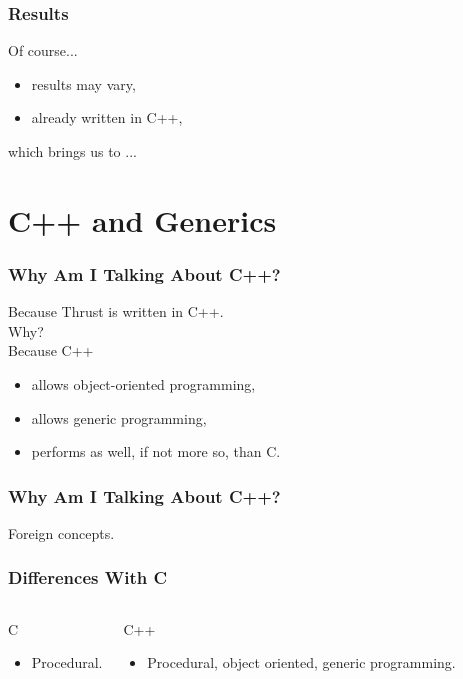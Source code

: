 \documentclass{beamer}
\begin{document}
\begin{frame}
  \frametitle{Results}
  {\Huge Of course...} \\
  \vspace{.5cm}
  \begin{itemize}
    \item results may vary,
    \item already written in C++,
  \end{itemize}
  \vspace{.5cm}
  which brings us to ...
\end{frame}

\section{C++ and Generics}

\begin{frame}
  \frametitle{Why Am I Talking About C++?}
  Because Thrust is written in C++. \\
  \vspace{.2cm}
  \hspace{.5cm}Why? \\
  \vspace{.2cm}
  \hspace{1cm}Because C++
  \vspace{.1cm}
  \begin{itemize}
    \item allows object-oriented programming,
    \item allows generic programming,
    \item performs as well, if not more so, than C.
  \end{itemize}
\end{frame}

\begin{frame}
  \frametitle{Why Am I Talking About C++?}
  Foreign concepts.
\end{frame}

\begin{frame}
  \frametitle{Differences With C}
  \begin{columns}
    \begin{block}{C}
    \begin{itemize}
    \item Procedural.
    \end{itemize}
    \end{block}

    \begin{block}{C++}
    \begin{itemize}
    \item Procedural, object oriented, generic programming.
    \end{itemize}
    \end{block}
  \end{columns}
\end{frame}
\end{document}
